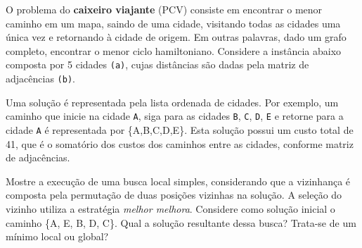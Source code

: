 \begin{exercise}
O problema do \textbf{caixeiro viajante} (PCV) consiste em encontrar o menor caminho em um mapa, saindo de uma cidade, visitando todas as cidades uma única vez e retornando à cidade de origem. Em outras palavras, dado um grafo completo, encontrar o menor ciclo hamiltoniano. Considere a instância abaixo composta por 5 cidades \texttt{(a)}, cujas distâncias são dadas pela matriz de adjacências \texttt{(b)}.

\begin{figure}[h]
	\centering

\end{figure}

\end{exercise}

Uma solução é representada pela lista ordenada de cidades. Por exemplo, um caminho que inicie na cidade \texttt{A}, siga para as cidades \texttt{B}, \texttt{C}, \texttt{D}, \texttt{E} e retorne para a cidade \texttt{A} é representada por \{A,B,C,D,E\}. Esta solução possui um custo total de 41, que é o somatório dos custos dos caminhos entre as cidades, conforme matriz de adjacências.

Mostre a execução de uma busca local simples, considerando que a vizinhança é composta pela permutação de duas posições vizinhas na solução. A seleção do vizinho utiliza a estratégia \textit{melhor melhora}. Considere como solução inicial o caminho \{A, E, B, D, C\}. Qual a solução resultante dessa busca? Trata-se de um mínimo local ou global?


